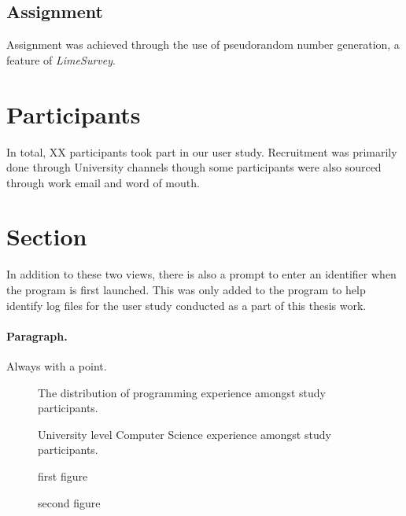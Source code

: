 \subsection{Assignment}

Assignment was achieved through the use of pseudorandom number generation, a
feature of \textit{LimeSurvey}.

\section{Participants}

In total, {XX} participants took part in our user study. Recruitment was
primarily done through University channels though some participants were also
sourced through work email and word of mouth.


\section{Section} In addition to these two views, there is also a prompt to
enter an identifier when the program is first launched. This was only added to
the program to help identify log files for the user study conducted as a part
of this thesis work.

\paragraph{Paragraph.} Always with a point.


\begin{figure}[H]
	\centering
	\scalebox{0.75}{}
	\caption{The distribution of programming experience amongst study participants.}
	\label{fig:programmingexp}
\end{figure}

\begin{figure}[H]
	\centering
	\scalebox{0.8}{}
	\caption{University level Computer Science experience amongst study participants.}
	\label{fig:uniexp}
\end{figure}

\begin{figure}[H]
	\centering
	\begin{minipage}{0.45\textwidth}
		\centering
		\scalebox{0.7}{}
		\caption{first figure}
	\end{minipage}\hspace{-1em}
	\begin{minipage}{0.45\textwidth}
		\centering
		\scalebox{0.7}{}
		\caption{second figure}
	\end{minipage}
\end{figure}



